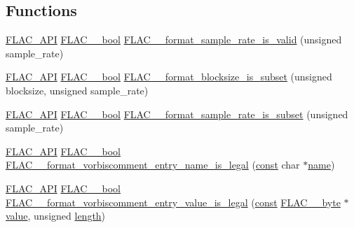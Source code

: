 \subsection*{Functions}
\begin{DoxyCompactItemize}
\item 
\hyperlink{group__flac__export_ga56ca07df8a23310707732b1c0007d6f5}{F\+L\+A\+C\+\_\+\+A\+PI} \hyperlink{ordinals_8h_a95103469f1cbd78b8cf250194985b34e}{F\+L\+A\+C\+\_\+\+\_\+bool} \hyperlink{group__flac__format_gaec1c46afe33c0bb200be68bb36e0dd32}{F\+L\+A\+C\+\_\+\+\_\+format\+\_\+sample\+\_\+rate\+\_\+is\+\_\+valid} (unsigned sample\+\_\+rate)
\item 
\hyperlink{group__flac__export_ga56ca07df8a23310707732b1c0007d6f5}{F\+L\+A\+C\+\_\+\+A\+PI} \hyperlink{ordinals_8h_a95103469f1cbd78b8cf250194985b34e}{F\+L\+A\+C\+\_\+\+\_\+bool} \hyperlink{group__flac__format_gacc6258efc7b737f90ee0c32bdb6775ba}{F\+L\+A\+C\+\_\+\+\_\+format\+\_\+blocksize\+\_\+is\+\_\+subset} (unsigned blocksize, unsigned sample\+\_\+rate)
\item 
\hyperlink{group__flac__export_ga56ca07df8a23310707732b1c0007d6f5}{F\+L\+A\+C\+\_\+\+A\+PI} \hyperlink{ordinals_8h_a95103469f1cbd78b8cf250194985b34e}{F\+L\+A\+C\+\_\+\+\_\+bool} \hyperlink{group__flac__format_ga996f8732a2502ad79a68bb4a9f945235}{F\+L\+A\+C\+\_\+\+\_\+format\+\_\+sample\+\_\+rate\+\_\+is\+\_\+subset} (unsigned sample\+\_\+rate)
\item 
\hyperlink{group__flac__export_ga56ca07df8a23310707732b1c0007d6f5}{F\+L\+A\+C\+\_\+\+A\+PI} \hyperlink{ordinals_8h_a95103469f1cbd78b8cf250194985b34e}{F\+L\+A\+C\+\_\+\+\_\+bool} \hyperlink{group__flac__format_ga14980d2e4b0ff2cdd4f22fcf8e75b54c}{F\+L\+A\+C\+\_\+\+\_\+format\+\_\+vorbiscomment\+\_\+entry\+\_\+name\+\_\+is\+\_\+legal} (\hyperlink{getopt1_8c_a2c212835823e3c54a8ab6d95c652660e}{const} char $\ast$\hyperlink{lib_2expat_8h_a1b49b495b59f9e73205b69ad1a2965b0}{name})
\item 
\hyperlink{group__flac__export_ga56ca07df8a23310707732b1c0007d6f5}{F\+L\+A\+C\+\_\+\+A\+PI} \hyperlink{ordinals_8h_a95103469f1cbd78b8cf250194985b34e}{F\+L\+A\+C\+\_\+\+\_\+bool} \hyperlink{group__flac__format_gae0707c9d46b2af02f1e145bdae331605}{F\+L\+A\+C\+\_\+\+\_\+format\+\_\+vorbiscomment\+\_\+entry\+\_\+value\+\_\+is\+\_\+legal} (\hyperlink{getopt1_8c_a2c212835823e3c54a8ab6d95c652660e}{const} \hyperlink{ordinals_8h_a5eb569b12d5b047cdacada4d57924ee3}{F\+L\+A\+C\+\_\+\+\_\+byte} $\ast$\hyperlink{lib_2expat_8h_a4a30a13b813682e68c5b689b45c65971}{value}, unsigned \hyperlink{test__lib_f_l_a_c_2format_8c_ac94dc16b22556ba5fa815655f27442da}{length})

\end{DoxyCompactItemize}
